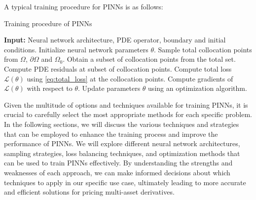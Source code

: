 \documentclass[12pt]{report} %
\theoremstyle{plain}           %
\theoremstyle{definition}      %
\theoremstyle{remark}          %
\begin{document}
A typical training procedure for PINNs is as follows:

\begin{algorithm}[H]
	\caption{Training procedure of PINNs}
	\begin{algorithmic}[1]
	\STATE \textbf{Input:} Neural network architecture, PDE operator, boundary and initial conditions.
	\STATE Initialize neural network parameters $\theta$.
	\STATE Sample total collocation points from $\Omega$, $\partial\Omega$ and $\Omega_0$.
	  \STATE Obtain a subset of collocation points from the total set.
	  \STATE Compute PDE residuals at subset of collocation points.
	  \STATE Compute total loss $\mathcal{L}(\theta)$ using \eqref{eq:total_loss} at the collocation points.
	  \STATE Compute gradients of $\mathcal{L}(\theta)$ with respect to $\theta$.
	  \STATE Update parameters $\theta$ using an optimization algorithm.
	\ENDWHILE
	\end{algorithmic}
	\label{alg:training_pinns}
\end{algorithm}

Given the multitude of options and techniques available for training PINNs, it is crucial to
carefully select the most appropriate methods for each specific problem. In the following sections,
we will discuss the various techniques and strategies that can be employed to enhance the training process
and improve the performance of PINNs. We will explore different neural network architectures,
sampling strategies, loss balancing techniques, and optimization methods that can be used to
train PINNs effectively. By understanding the strengths and weaknesses of each approach, we can
make informed decisions about which techniques to apply in our specific use case, ultimately leading to
more accurate and efficient solutions for pricing multi-asset derivatives.




\end{document}
